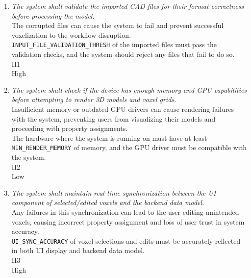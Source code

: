 \documentclass{article}
\begin{document}
\begin{enumerate}
\renewcommand{\labelenumi}{SCR \arabic{enumi}.}

\item \hypertarget{scr1}{}\emph{The system shall validate the imported CAD files for their format correctness before processing the model.}\\
     The corrupted files can cause the system to fail and prevent successful voxelization to the workflow disruption.\\
     \texttt{INPUT\_FILE\_VALIDATION\_THRESH} of the imported files must pass the validation checks, and the system should reject any files that fail to do so.\\
     H1\\
     High

\item \hypertarget{scr2}{}\emph{The system shall check if the device has enough memory and GPU capabilities before attempting to render 3D models and voxel grids.}\\
     Insufficient memory or outdated GPU drivers can cause rendering failures with the system, preventing users from visualizing their models and proceeding with property assignments.\\
     The hardware where the system is running on must have at least \texttt{MIN\_RENDER\_MEMORY} of memory, and the GPU driver must be compatible with the system.\\
     H2\\
     Low

\item \hypertarget{scr3}{}\emph{The system shall maintain real-time synchronization between the UI component of selected/edited voxels and the backend data model.}\\
     Any failures in this synchronization can lead to the user editing unintended voxels, causing incorrect property assignment and loss of user trust in system accuracy.\\
     \texttt{UI\_SYNC\_ACCURACY} of voxel selections and edits must be accurately reflected in both UI display and backend data model.\\
     H3\\
     High


\end{enumerate}
\end{document}

